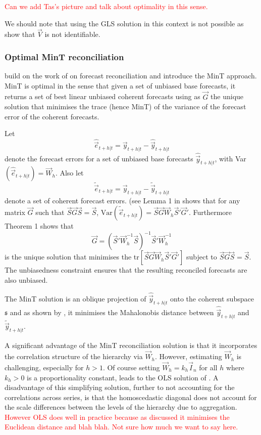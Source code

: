 \documentclass[graybox]{svmult}
\begin{document}
\textcolor{red}{Can we add Tas's picture and talk about optimality in this sense.}

We should note that using the GLS solution in this context is not possible as \cite{WicEtAl2019} show that $\vec{V}$ is not identifiable.


\subsubsection{Optimal MinT reconciliation}

\cite{WicEtAl2019} build on the work of \citet{HynEtAl2011} on forecast reconciliation and introduce the MinT approach. MinT is optimal in the sense that given a set of unbiased base forecasts, it returns a set of best linear unbiased coherent forecasts using as $\vec{G}$ the unique solution that minimises the trace (hence MinT) of the variance of the forecast error of the coherent forecasts.

Let
\begin{equation}\label{eq:base errors}
\hat{\vec{e}}_{t+h|t} = \vec{y}_{t+h|t}-\hat{\vec{y}}_{t+h|t}
\end{equation}
denote the forecast errors for a set of unbiased base forecasts $\hat{\vec{y}}_{t+h|t}$, with Var$(\hat{\vec{e}}_{t+h|t})=\vec{W}_h$. Also let \begin{equation*}
\tilde{\vec{e}}_{t+h|t} = \vec{y}_{t+h|t}-\tilde{\vec{y}}_{t+h|t}
\end{equation*} denote a set of coherent forecast errors. (see Lemma 1 in \cite{WicEtAl2019} shows that for any matrix $\vec{G}$ such that $\vec{S}\vec{G}\vec{S}=\vec{S}$, $\text{Var}(\tilde{\vec{e}}_{t+h|t})=\vec{S}\vec{G}\vec{W}_h\vec{S}'\vec{G}'
$. Furthermore Theorem 1 shows that
\begin{equation} \label{eq:MinT}
\vec{G} = (\vec{S}'{\vec{W}}^{-1}_h\vec{S})^{-1}\vec{S}'{\vec{W}}^{-1}_h
\end{equation}
is the unique solution that minimises the tr$[\vec{S}\vec{G}\vec{W}_h\vec{S}'\vec{G}']$ subject to $\vec{S}\vec{G}\vec{S}=\vec{S}$. The unbiasedness constraint ensures that the resulting reconciled forecasts are also unbiased.

The MinT solution is an oblique projection of $\hat{\vec{y}}_{t+h|t}$ onto the coherent subspace $\mathfrak{s}$ and as shown by \cite{WicEtAl2019}, it minimises the Mahalonobis distance between $\hat{\vec{y}}_{t+h|t}$ and $\tilde{\vec{y}}_{t+h|t}$.

A significant advantage of the MinT reconciliation solution is that it incorporates the correlation structure of the hierarchy via ${\vec{W}}_{h}$. However, estimating ${\vec{W}}_{h}$ is challenging, especially for $h>1$. Of course setting ${\vec{W}}_{h}=k_h\vec{I}_n$ for all $h$ where $k_h>0$ is a proportionality constant, leads to the OLS solution of \cite{HynEtAl2011}. A disadvantage of this simplifying solution, further to not accounting for the correlations across series, is that the homoscedastic diagonal does not account for the scale differences between the levels of the hierarchy due to aggregation. \textcolor{red}{However OLS does well in practice because as discussed it minimises the Euclidean distance and blah blah. Not sure how much we want to say here.}
\end{document}

